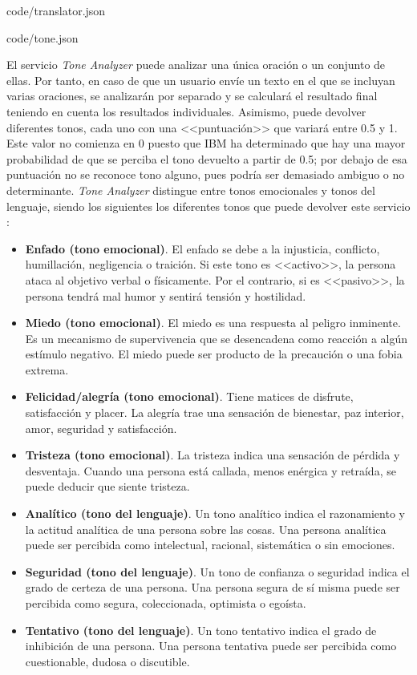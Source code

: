 \clearpage


						{code/translator.json}


						{code/tone.json}

El servicio \textit{Tone Analyzer} puede analizar una única oración o un conjunto de ellas. Por tanto, en caso de que un usuario envíe un texto en el que se incluyan varias oraciones, se analizarán por separado y se calculará el resultado final teniendo en cuenta los resultados individuales. Asimismo, puede devolver diferentes tonos, cada uno con una <<puntuación>> que variará entre 0.5 y 1. Este valor no comienza en 0 puesto que IBM ha determinado que hay una mayor probabilidad de que se perciba el tono devuelto a partir de 0.5; por debajo de esa puntuación no se reconoce tono alguno, pues podría ser demasiado ambiguo o no determinante. \textit{Tone Analyzer} distingue entre tonos emocionales y tonos del lenguaje, siendo los siguientes los diferentes tonos que puede devolver este servicio \cite{IBM2018}:

\begin{itemize}
	\item \textbf{Enfado (tono emocional)}. El enfado se debe a la injusticia, conflicto, humillación, negligencia o traición. Si este tono es <<activo>>, la persona ataca al objetivo verbal o físicamente. Por el contrario, si es <<pasivo>>, la persona tendrá mal humor y sentirá tensión y hostilidad.
	\item \textbf{Miedo (tono emocional)}. El miedo es una respuesta al peligro inminente. Es un mecanismo de supervivencia que se desencadena como reacción a algún estímulo negativo. El miedo puede ser producto de la precaución o una fobia extrema.
	\item \textbf{Felicidad/alegría (tono emocional)}. Tiene matices de disfrute, satisfacción y placer. La alegría trae una sensación de bienestar, paz interior, amor, seguridad y satisfacción.
	\item \textbf{Tristeza (tono emocional)}. La tristeza indica una sensación de pérdida y desventaja. Cuando una persona está callada, menos enérgica y retraída, se puede deducir que siente tristeza.
	\item \textbf{Analítico (tono del lenguaje)}. Un tono analítico indica el razonamiento y la actitud analítica de una persona sobre las cosas. Una persona analítica puede ser percibida como intelectual, racional, sistemática o sin emociones.
	\item \textbf{Seguridad (tono del lenguaje)}. Un tono de confianza o seguridad indica el grado de certeza de una persona. Una persona segura de sí misma puede ser percibida como segura, coleccionada, optimista o egoísta.
	\item \textbf{Tentativo (tono del lenguaje)}. Un tono tentativo indica el grado de inhibición de una persona. Una persona tentativa puede ser percibida como cuestionable, dudosa o discutible.
\end{itemize}

